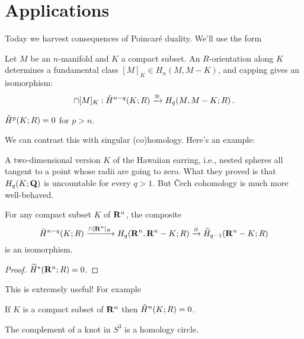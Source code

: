 \section{Applications}
Today we harvest consequences of Poincar\'e duality. We'll use the form
\begin{theorem}
Let $M$ be an $n$-manifold and $K$ a compact subset.
An $R$-orientation along $K$ determines a fundamental class
$[M]_K\in H_n(M,M-K)$, and capping gives an isomorphism:
\[
\cap[M]_K:\check{H}^{n-q}(K;R)\xrightarrow{\cong}H_q(M,M-K;R)\,.
\]
\end{theorem}
\begin{corollary}
$\check{H}^p(K;R)=0$ for $p>n$.
\end{corollary}
We can contrast this with singular (co)homology. Here's an example:
\begin{example}
A two-dimensional version $K$ of the Hawaiian earring, i.e., nested spheres all tangent to a point whose radii are going to zero. What they proved is that $H_q(K;\mathbf Q)$ is uncountable for every $q>1$. But \v{C}ech cohomology is much more
well-behaved.
\end{example}
\begin{theorem}
For any compact subset $K$ of $\mathbf R^n$, the composite
\[
\check{H}^{n-q}(K;R)\xrightarrow{\cap[\mathbf R^n]_K}H_q(\mathbf R^n,\mathbf R^n-K;R)
\xrightarrow{\partial}\widetilde{H}_{q-1}(\mathbf R^n-K;R)
\]
is an isomorphism.
\end{theorem}
\begin{proof} $\widetilde H^*(\mathbf R^n;R)=0$. 
\end{proof}
This is extremely useful! For example
\begin{corollary}
If $K$ is a compact subset of $\mathbf R^n$ then $\check{H}^n(K;R)=0$. 
\end{corollary}
\begin{corollary} The complement of a knot in $S^3$ is a homology circle. 
\end{corollary}
 

